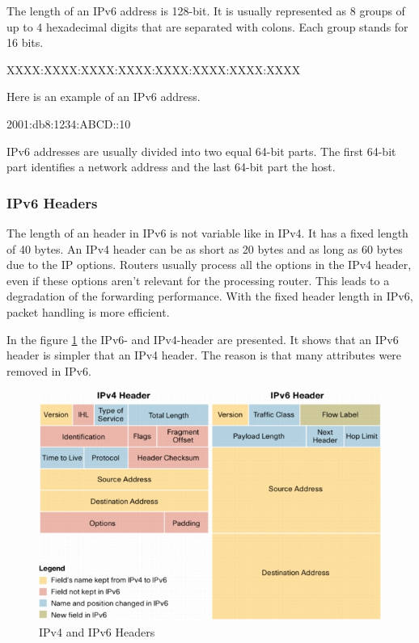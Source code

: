 \documentclass[a4paper]{report}
\begin{document}
The length of an IPv6 address is 128-bit. It is usually represented as 8 groups of up to 4 hexadecimal digits that are separated with colons. Each group stands for 16 bits.
\begin{codebox}
	XXXX:XXXX:XXXX:XXXX:XXXX:XXXX:XXXX:XXXX
\end{codebox}
Here is an example of an IPv6 address.
\begin{codebox}
	2001:db8:1234:ABCD::10
\end{codebox}
IPv6 addresses are usually divided into two equal 64-bit parts. The first 64-bit part identifies a network address and the last 64-bit part the host. \parencite[144-146]{Loshin2004}
 
\subsubsection{IPv6 Headers}
\label{sssec:ipv6:headers}
The length of an header in IPv6 is not variable like in IPv4. It has a fixed length of 40 bytes. An IPv4 header can be as short as 20 bytes and as long as 60 bytes due to the IP options. Routers usually process all the options in the IPv4 header, even if these options aren't relevant for the processing router. This leads to a degradation of the forwarding performance.  With the fixed header length in IPv6, packet handling is more efficient. \parencite[128]{Loshin2004}

In the figure \ref{fig:IPv4_IPv6_Header} the IPv6- and IPv4-header are presented. It shows that an IPv6 header is simpler that an IPv4 header. The reason is that many attributes were removed in IPv6.
\begin{figure}
	\centering
	\includegraphics[width=0.8\linewidth]{ipv6_ipv4_headers}%
	\caption {IPv4 and IPv6 Headers \parencite{cisco2006}}
	\label{fig:IPv4_IPv6_Header}
\end{figure}
\end{document}
